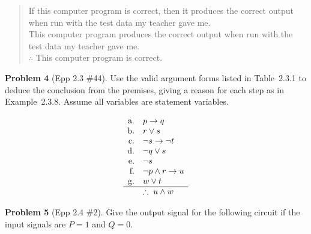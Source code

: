 \documentclass[11pt]{article}
\begin{document}
\begin{quote}
  If this computer program is correct, then it produces the
  correct output when run with the test data my teacher gave me.\\
  This computer program produces the correct output when run with
  the test data my teacher gave me.\\
  $\therefore$ This computer program is correct.
\end{quote}

\bigskip

\noindent\textbf{Problem 4} (Epp 2.3 \#44). \;
Use the valid argument forms listed in Table~2.3.1 to deduce
the conclusion from the premises, giving a reason for each step
as in Example~2.3.8.  Assume all variables are statement
variables.

\[
  \begin{array}{rll}
    \text{a.} & p \to q            \\
    \text{b.} & r \lor s            \\
    \text{c.} & \lnot s \to \lnot t \\
    \text{d.} & \lnot q \lor s      \\
    \text{e.} & \lnot s             \\
    \text{f.} & \lnot p \land r \to u \\
    \text{g.} & w \lor t            \\
    \hline
    & \therefore\; u \land w
  \end{array}
\]

\bigskip

\noindent\textbf{Problem 5} (Epp 2.4 \#2). \;
Give the output signal for the following circuit if the input
signals are $P = 1$ and $Q = 0$.
\end{document}
